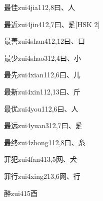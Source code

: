 \begin{entry}{最佳}{zui4jia1}{12,8}{⽈、⼈}
\end{entry}

\begin{entry}{最近}{zui4jin4}{12,7}{⽈、⾡}[HSK 2]
\end{entry}

\begin{entry}{最善}{zui4shan4}{12,12}{⽈、⼝}
\end{entry}

\begin{entry}{最少}{zui4shao3}{12,4}{⽈、⼩}
\end{entry}

\begin{entry}{最先}{zui4xian1}{12,6}{⽈、⼉}
\end{entry}

\begin{entry}{最新}{zui4xin1}{12,13}{⽈、⽄}
\end{entry}

\begin{entry}{最优}{zui4you1}{12,6}{⽈、⼈}
\end{entry}

\begin{entry}{最远}{zui4yuan3}{12,7}{⽈、⾡}
\end{entry}

\begin{entry}{最终}{zui4zhong1}{12,8}{⽈、⽷}
\end{entry}

\begin{entry}{罪犯}{zui4fan4}{13,5}{⽹、⽝}
\end{entry}

\begin{entry}{罪行}{zui4xing2}{13,6}{⽹、⾏}
\end{entry}

\begin{entry}{醉}{zui4}{15}{⾣}
\end{entry}

